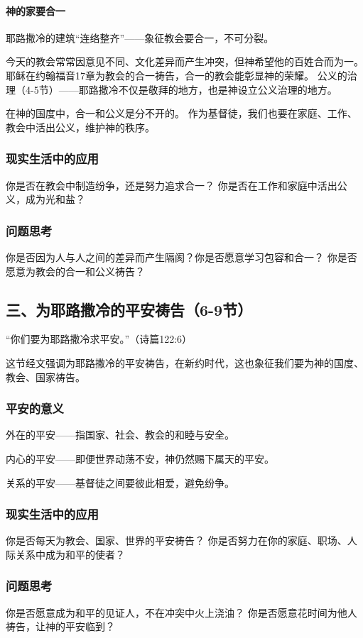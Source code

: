 \documentclass[a4paper, 12pt]{article}
\begin{document}
\paragraph*{神的家要合一}
耶路撒冷的建筑“连络整齐”——象征教会要合一，不可分裂。

今天的教会常常因意见不同、文化差异而产生冲突，但神希望他的百姓合而为一。
耶稣在约翰福音17章为教会的合一祷告，合一的教会能彰显神的荣耀。
公义的治理（4-5节）——耶路撒冷不仅是敬拜的地方，也是神设立公义治理的地方。

在神的国度中，合一和公义是分不开的。
作为基督徒，我们也要在家庭、工作、教会中活出公义，维护神的秩序。
\subsubsection*{现实生活中的应用}
你是否在教会中制造纷争，还是努力追求合一？
你是否在工作和家庭中活出公义，成为光和盐？
\subsubsection*{问题思考}
你是否因为人与人之间的差异而产生隔阂？你是否愿意学习包容和合一？
你是否愿意为教会的合一和公义祷告？
\subsection*{三、为耶路撒冷的平安祷告（6-9节）}
“你们要为耶路撒冷求平安。”（诗篇122:6）

这节经文强调为耶路撒冷的平安祷告，在新约时代，这也象征我们要为神的国度、教会、国家祷告。

\subsubsection*{平安的意义}

\hspace{0.6cm}外在的平安——指国家、社会、教会的和睦与安全。

内心的平安——即便世界动荡不安，神仍然赐下属天的平安。

关系的平安——基督徒之间要彼此相爱，避免纷争。

\subsubsection*{现实生活中的应用}
你是否每天为教会、国家、世界的平安祷告？
你是否努力在你的家庭、职场、人际关系中成为和平的使者？
\subsubsection*{问题思考}
你是否愿意成为和平的见证人，不在冲突中火上浇油？
你是否愿意花时间为他人祷告，让神的平安临到？
\end{document}

